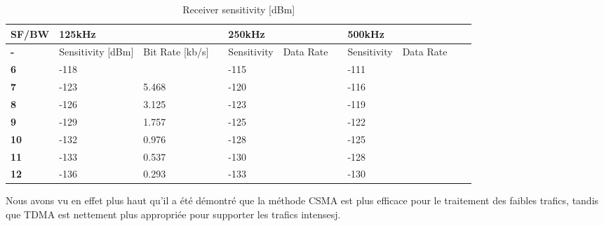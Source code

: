 \begin{table}[h!]
\scriptsize
	\begin{tabular}{l|lll|lll|lll|l}
	\textbf{\ac{SF}/\ac{BW}} & \multicolumn{3}{l}{\textbf{125kHz}}                   & \multicolumn{3}{l}{\textbf{250kHz} }             & \multicolumn{3}{l}{\textbf{500kHz} }             & \\\hline
	\textbf{-}     & Sensitivity [dBm]                  & Bit Rate [kb/s]&   & Sensitivity                        & Data Rate &   & Sensitivity                        & Data Rate &   & \\
	\textbf{6}     & -118                               &                &   & -115                               &           &   & -111                               &           &   & \\
	\textbf{7}     & -123                               & 5.468          &   & -120                               &           &   & -116                               &           &   & \\
	\textbf{8}     & -126                               & 3.125          &   & -123                               &           &   & -119                               &           &   & \\
	\textbf{9}     & -129                               & 1.757          &   & -125                               &           &   & -122                               &           &   & \\
	\textbf{10}    & -132                               & 0.976          &   & -128                               &           &   & -125                               &           &   & \\
	\textbf{11}    & -133                               & 0.537          &   & -130                               &           &   & -128                               &           &   & \\
	\textbf{12}    & -136                               & 0.293          &   & -133                               &           &   & -130                               &           &   & \\\hline
	\end{tabular}
\caption{\label{tab:EE} Receiver sensitivity [dBm]}
\end{table}




\cite{_evaluation_} Nous avons vu en effet plus haut qu’il a été démontré que la méthode CSMA est plus efficace pour le traitement des faibles trafics,
	tandis que TDMA est nettement plus appropriée pour supporter les trafics intensesj.




